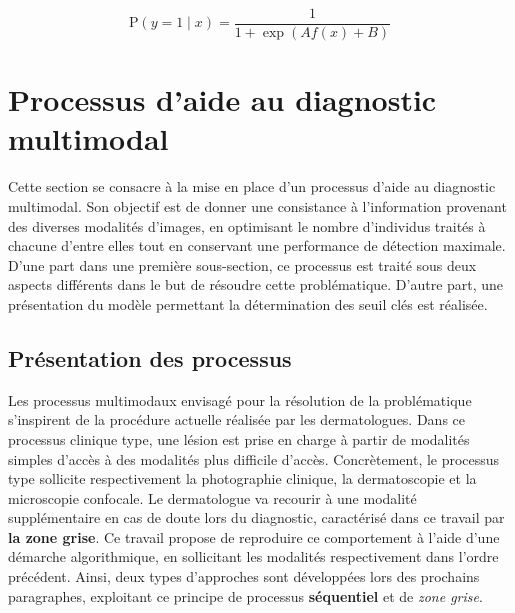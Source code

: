 \begin{equation}
    \mathrm{P}(y=1 \mid x)=\frac{1}{1+\exp (A f(x)+B)}
    \label{eq:sigmoid_calibration}
\end{equation}

\clearpage

\section{Processus d'aide au diagnostic multimodal}
Cette section se consacre à la mise en place d'un processus d'aide au diagnostic multimodal. Son objectif est de donner une consistance à l'information provenant des diverses modalités d'images, en optimisant le nombre d'individus traités à chacune d'entre elles tout en conservant une performance de détection maximale. D'une part dans une première sous-section, ce processus est traité sous deux aspects différents dans le but de résoudre cette problématique. D'autre part, une présentation du modèle permettant la détermination des seuil clés est réalisée.

\subsection{Présentation des processus}
Les processus multimodaux envisagé pour la résolution de la problématique s'inspirent de la procédure actuelle réalisée par les dermatologues. Dans ce processus clinique type, une lésion est prise en charge à partir de modalités simples d'accès à des modalités plus difficile d'accès. Concrètement, le processus type sollicite respectivement la photographie clinique, la dermatoscopie et la microscopie confocale. Le dermatologue va recourir à une modalité supplémentaire en cas de doute lors du diagnostic, caractérisé dans ce travail par \textbf{la zone grise}. Ce travail propose de reproduire ce comportement à l'aide d'une démarche algorithmique, en sollicitant les modalités respectivement dans l'ordre précédent. Ainsi, deux types d'approches sont développées lors des prochains paragraphes, exploitant ce principe de processus \textbf{séquentiel} et de \textit{zone grise}.\par

